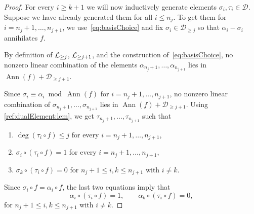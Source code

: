 \documentclass[a4paper,11pt,reqno]{amsart}
\newcommand{\calD}{\mathcal{D}}
\DeclareMathOperator{\Ann}{Ann}
\numberwithin{equation}{section}
\theoremstyle{definition}
\theoremstyle{plain}
\theoremstyle{remark}
\begin{document}
\begin{proof}
        For every $i\geq k+1$ we will now inductively generate elements $\sigma_i,
        \tau_i\in \calD$. Suppose we have already {generated} them for all $i \leq
        n_j$. To get them for $i=n_j+1, \ldots ,n_{j+1}$, we
        use~\eqref{eq:basisChoice} and fix $\sigma_i\in \calD_{\geq j}$ so
        that $\alpha_i - \sigma_i$ annihilates $f$.

        By definition of $\mathcal{L}_{\geq j}$, $\mathcal{L}_{\geq j+1}$, and the construction
        of~\eqref{eq:basisChoice}, no nonzero linear combination of the elements
        $\alpha_{n_j+1}, \ldots , \alpha_{n_{j+1}}$
        lies in $\Ann(f) + \calD_{\geq j+1}$.

        Since $\sigma_i \equiv \alpha_i \bmod \Ann(f)$ for $i=n_j+1,  \ldots ,
        n_{j+1}$, no nonzero linear combination of $\sigma_{n_j+1}, \ldots ,
        \sigma_{n_{j+1}}$ lies in $\Ann(f) + \calD_{\geq j+1}$.
        Using
        \autoref{ref:dualElement:lem}, we {get} $\tau_{n_j+1}, \ldots
        ,\tau_{n_{j+1}}$ {such that}
        \begin{enumerate}[label=(\arabic*), left= 3pt, widest=2,nosep]
            \item $\deg(\tau_i \circ f) \leq j$ for every
                $i=n_{j}+1, \ldots ,n_{j+1}$,
            \item $\sigma_i \circ (\tau_i \circ f) = 1$ for every
                $i=n_{j}+1, \ldots ,n_{j+1}$,
            \item $\sigma_k\circ (\tau_i \circ f) = 0$ for $n_{j}+1\leq
                i,k\leq n_{j+1}$ with $i\neq k$.
        \end{enumerate}
        Since $\sigma_i\circ f = \alpha_i \circ f$,
        the last two equations imply that
        \begin{equation}\label{eq:linearPart}
            \alpha_i\circ (\tau_i\circ f) = 1, \qquad
            \alpha_k\circ (\tau_i\circ f) = 0,
        \end{equation}
        for $n_{j}+1\leq i,k\leq n_{j+1}$ with $i\neq k$.


\end{proof}
\end{document}
